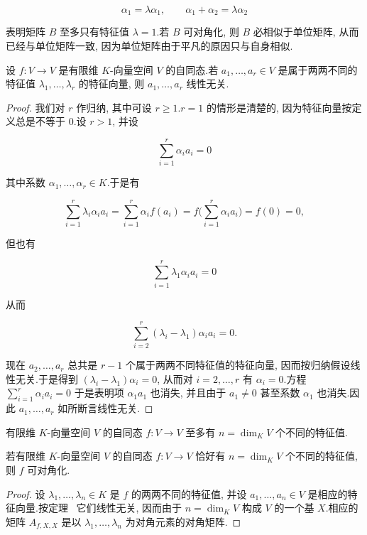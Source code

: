 \[
\alpha_1 = \lambda \alpha_1, \qquad \alpha_1 + \alpha_2 = \lambda \alpha_2\]

表明矩阵 $B$ 至多只有特征值 $\lambda = 1$.若 $B$ 可对角化, 则 $B$ 必相似于单位矩阵, 从而已经与单位矩阵一致, 因为单位矩阵由于平凡的原因只与自身相似.


\begin{theorem}\label{thm:6.1.8}
设 $f \colon V \longrightarrow V$ 是有限维 $K$-向量空间 $V$ 的自同态.若 $a_1, \ldots, a_r \in V$ 是属于两两不同的特征值 $\lambda_1, \ldots, \lambda_r$ 的特征向量, 则 $a_1, \ldots, a_r$ 线性无关.
\end{theorem}

\begin{proof}
我们对 $r$ 作归纳, 其中可设 $r \geq 1$.$r = 1$ 的情形是清楚的, 因为特征向量按定义总是不等于 $0$.设 $r > 1$, 并设

\[
\sum_{i = 1}^{r} \alpha_i a_i = 0\]

其中系数 $\alpha_1, \ldots, \alpha_r \in K$.于是有

\[
\sum_{i = 1}^{r} \lambda_i \alpha_i a_i = \sum_{i = 1}^{r} \alpha_i f(a_i) = f\Big(\sum_{i = 1}^{r} \alpha_i a_i\Big) = f(0) = 0,\]

但也有

\[
\sum_{i = 1}^{r} \lambda_1 \alpha_i a_i = 0\]

从而

\[
\sum_{i = 2}^{r} (\lambda_i - \lambda_1) \alpha_i a_i = 0\text{.}\]

现在 $a_2, \ldots, a_r$ 总共是 $r - 1$ 个属于两两不同特征值的特征向量, 因而按归纳假设线性无关.于是得到 $(\lambda_i - \lambda_1)\alpha_i = 0$, 从而对 $i = 2, \ldots, r$ 有 $\alpha_i = 0$.方程 $\sum_{i = 1}^{r} \alpha_i a_i = 0$ 于是表明项 $\alpha_1 a_1$ 也消失, 并且由于 $a_1 \neq 0$ 甚至系数 $\alpha_1$ 也消失.因此 $a_1, \ldots, a_r$ 如所断言线性无关.
\end{proof}

\begin{corollary}\label{cor:6.1.9}
有限维 $K$-向量空间 $V$ 的自同态 $f \colon V \longrightarrow V$ 至多有 $n = \dim_K V$ 个不同的特征值.
\end{corollary}

\begin{corollary}\label{cor:6.1.10}
若有限维 $K$-向量空间 $V$ 的自同态 $f \colon V \longrightarrow V$ 恰好有 $n = \dim_K V$ 个不同的特征值, 则 $f$ 可对角化.
\end{corollary}

\begin{proof}
设 $\lambda_1, \ldots, \lambda_n \in K$ 是 $f$ 的两两不同的特征值, 并设 $a_1, \ldots, a_n \in V$ 是相应的特征向量.按定理~ 它们线性无关, 因而由于 $n = \dim_K V$ 构成 $V$ 的一个基 $X$.相应的矩阵 $A_{f, X, X}$ 是以 $\lambda_1, \ldots, \lambda_n$ 为对角元素的对角矩阵.
\end{proof}

